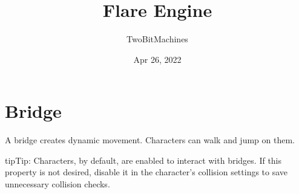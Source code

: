 \documentclass[letterpaper,11pt,english,openany,oneside]{sphinxmanual}
\title{Flare Engine}
\date{Apr 26, 2022}
\author{TwoBitMachines}
\begin{document}
\pagestyle{empty}
\sphinxmaketitle
\pagestyle{plain}
\sphinxtableofcontents
\pagestyle{normal}
\label{\detokenize{index::doc}}


\sphinxstepscope


\chapter{Bridge}
\label{\detokenize{interactables/bridge:bridge}}\label{\detokenize{interactables/bridge::doc}}
\sphinxAtStartPar
A bridge creates dynamic movement. Characters can walk and jump on them.


\begin{sphinxadmonition}{tip}{Tip:}
\sphinxAtStartPar
Characters, by default, are enabled to interact with bridges. If this property
is not desired, disable it in the character’s collision settings to save
unnecessary collision checks.
\end{sphinxadmonition}
\end{document}
